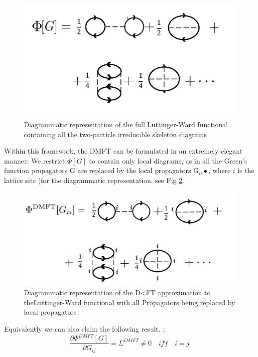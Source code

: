 \documentclass[10pt]{ruthesis}
\begin{document}
\begin{figure}[H]
\includegraphics[width=\columnwidth]{Lw_func_exact.jpg}
\caption{Diagrammatic representation of the full Luttinger-Ward functional containing all the two-particle irreducible skeleton diagrams \label{LW_exact}}
\end{figure} 
 
 
Within this framework, the DMFT can be formulated in an extremely elegant manner: We restrict $\Phi[G]$ to contain only local diagrams, as in all the Green's function propagators G are replaced by the local propagators G$_{ii}•$, where $i$ is the lattice site (for the diagrammatic representation, see Fig \ref{LW_DMFT}.

\begin{figure}[H]
\includegraphics[width=\columnwidth]{Lw_func_DMFT.jpg}
\caption{Diagrammatic representation of the D<FT approximation to theLuttinger-Ward functional with all Propagators being replaced by local propagators \label{LW_DMFT}}
\end{figure}

 Equivalently we can also claim the following result.  :
\begin{equation}
 \dfrac{\partial \Phi^{DMFT}[G]}{\partial G_{ij}} =\Sigma^{DMFT} \neq 0 \quad iff \quad i=j
\end{equation}
\end{document}
